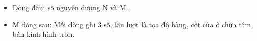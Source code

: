 \begin{itemize}
	\item     Dòng đầu: số nguyên dương N và M.   
\end{itemize}
\begin{itemize}
	\item     M dòng sau: Mỗi dòng ghi 3 số, lần lượt là tọa độ hàng, cột của ô chứa tâm, bán kính hình tròn.   
\end{itemize}

\